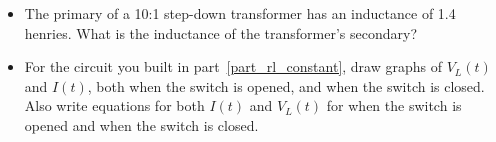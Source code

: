 \begin{itemize}
\item The primary of a 10:1 step-down transformer has an inductance of 1.4 henries.  What is the inductance of the transformer's secondary?


\item For the circuit you built in part~\ref{part_rl_constant}, draw graphs of $V_L(t)$ and $I(t)$, both when the switch is opened, and when the switch is closed.  Also write equations for both $I(t)$ and $V_L(t)$ for when the switch is opened and when the switch is closed.

\end{itemize}






